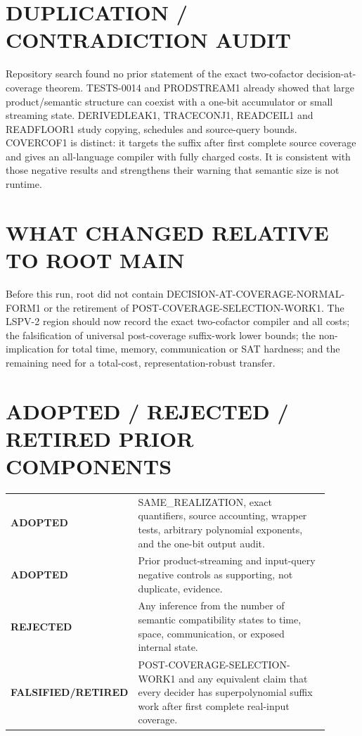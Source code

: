 \documentclass[11pt]{article}
\newcommand{\Status}[1]{\textbf{#1}}
\begin{document}
\section{DUPLICATION / CONTRADICTION AUDIT}
Repository search found no prior statement of the exact two-cofactor
decision-at-coverage theorem. TESTS-0014 and PRODSTREAM1 already showed that
large product/semantic structure can coexist with a one-bit accumulator or
small streaming state. DERIVEDLEAK1, TRACECONJ1, READCEIL1 and READFLOOR1
study copying, schedules and source-query bounds. COVERCOF1 is distinct: it
targets the suffix after first complete source coverage and gives an
all-language compiler with fully charged costs. It is consistent with those
negative results and strengthens their warning that semantic size is not
runtime.

\section{WHAT CHANGED RELATIVE TO ROOT MAIN}
Before this run, root  did not contain
DECISION-AT-COVERAGE-NORMAL-FORM1 or the retirement of
POST-COVERAGE-SELECTION-WORK1. The LSPV-2 region should now record the exact
two-cofactor compiler and all costs; the falsification of universal
post-coverage suffix-work lower bounds; the non-implication for total time,
memory, communication or SAT hardness; and the remaining need for a total-cost,
representation-robust transfer.

\section{ADOPTED / REJECTED / RETIRED PRIOR COMPONENTS}
\begin{center}
\begin{tabular}{>{\raggedright}p{0.24\linewidth}p{0.66\linewidth}}
\toprule
\Status{ADOPTED} & SAME\_REALIZATION, exact quantifiers, source accounting,
wrapper tests, arbitrary polynomial exponents, and the one-bit output audit.\\
\Status{ADOPTED} & Prior product-streaming and input-query negative controls as
supporting, not duplicate, evidence.\\
\Status{REJECTED} & Any inference from the number of semantic compatibility
states to time, space, communication, or exposed internal state.\\
\Status{FALSIFIED/RETIRED} & POST-COVERAGE-SELECTION-WORK1 and any equivalent
claim that every decider has superpolynomial suffix work after first complete
real-input coverage.\\
\bottomrule
\end{tabular}
\end{center}
\end{document}
